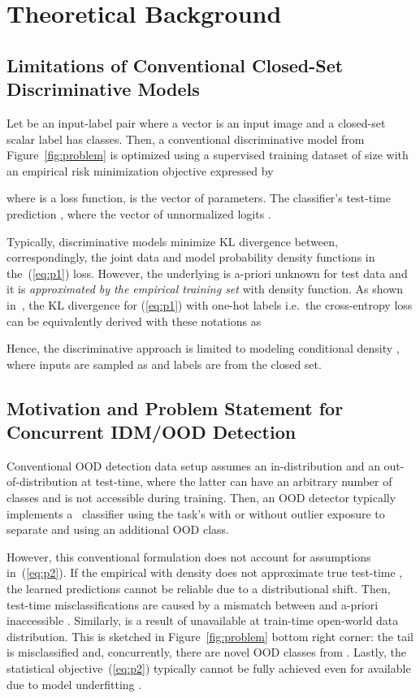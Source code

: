 \documentclass[accepted, startpage]{uai2023}
\newcommand{\ie}{i.e.}
\begin{document}
\section{Theoretical Background}\label{sec:theory}
\subsection{Limitations of Conventional Closed-Set Discriminative Models}\label{subsec:discussion}
Let  be an input-label pair where a vector  is an input image and a closed-set scalar label  has  classes. Then, a conventional discriminative model  from Figure~\ref{fig:problem} is optimized using a supervised training dataset  of size  with an empirical risk minimization objective expressed by

where  is a loss function,  is the vector of parameters. The classifier's test-time prediction , where the vector of unnormalized logits .

Typically, discriminative models minimize KL divergence  between, correspondingly, the joint data and model probability density functions in the~(\ref{eq:p1}) loss. However, the underlying  is a-priori unknown for test data and it is \textit{approximated by the empirical training set}  with  density function. As shown in~\citep{Gudovskiy_2020_CVPR}, the KL divergence for (\ref{eq:p1}) with one-hot labels  \ie~the cross-entropy loss can be equivalently derived with these notations as


Hence, the discriminative approach is limited to modeling conditional density , where inputs are sampled as  and labels  are from the closed set.

\subsection{Motivation and Problem Statement for Concurrent IDM/OOD Detection}\label{subsec:motivation}
Conventional OOD detection data setup assumes an in-distribution  and an out-of-distribution  at test-time, where the latter can have an arbitrary number of classes and is not accessible during training. Then, an OOD detector typically implements a ~classifier using the task's  with or without outlier exposure to separate  and  using an additional OOD class.

However, this conventional formulation does not account for assumptions in~(\ref{eq:p2}). If the empirical  with  density does not approximate true test-time , the learned predictions  cannot be reliable due to a distributional shift. Then, test-time misclassifications are caused by a mismatch between  and a-priori inaccessible . Similarly,  is a result of unavailable at train-time open-world data distribution. This is sketched in Figure~\ref{fig:problem} bottom right corner: the  tail is misclassified and, concurrently, there are novel OOD classes from . Lastly, the statistical objective~(\ref{eq:p2}) typically cannot be fully achieved even for available  due to model underfitting .
\end{document}
